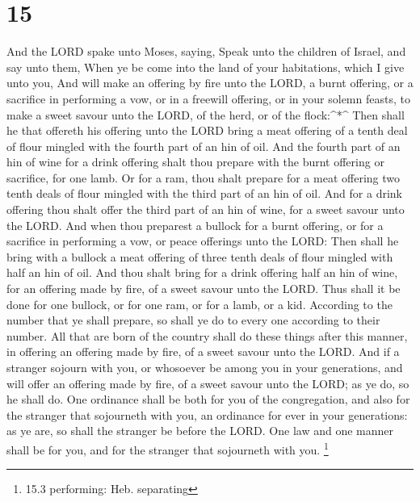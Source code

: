\hypertarget{section-14}{%
\section{15}\label{section-14}}

 And the LORD spake unto Moses, saying,  Speak
unto the children of Israel, and say unto them, When ye be come into the
land of your habitations, which I give unto you,  And will
make an offering by fire unto the LORD, a burnt offering, or a sacrifice
in performing a vow, or in a freewill offering, or in your solemn
feasts, to make a sweet savour unto the LORD, of the herd, or of the
flock:\^{}*\^{}  Then shall he that offereth his offering
unto the LORD bring a meat offering of a tenth deal of flour mingled
with the fourth part of an hin of oil.  And the fourth part
of an hin of wine for a drink offering shalt thou prepare with the burnt
offering or sacrifice, for one lamb.  Or for a ram, thou
shalt prepare for a meat offering two tenth deals of flour mingled with
the third part of an hin of oil.  And for a drink offering
thou shalt offer the third part of an hin of wine, for a sweet savour
unto the LORD.  And when thou preparest a bullock for a
burnt offering, or for a sacrifice in performing a vow, or peace
offerings unto the LORD:  Then shall he bring with a bullock
a meat offering of three tenth deals of flour mingled with half an hin
of oil.  And thou shalt bring for a drink offering half an
hin of wine, for an offering made by fire, of a sweet savour unto the
LORD.  Thus shall it be done for one bullock, or for one
ram, or for a lamb, or a kid.  According to the number that
ye shall prepare, so shall ye do to every one according to their number.
 All that are born of the country shall do these things
after this manner, in offering an offering made by fire, of a sweet
savour unto the LORD.  And if a stranger sojourn with you,
or whosoever be among you in your generations, and will offer an
offering made by fire, of a sweet savour unto the LORD; as ye do, so he
shall do.  One ordinance shall be both for you of the
congregation, and also for the stranger that sojourneth with you, an
ordinance for ever in your generations: as ye are, so shall the stranger
be before the LORD.  One law and one manner shall be for
you, and for the stranger that sojourneth with you. \footnote{15.3
  performing: Heb. separating}

